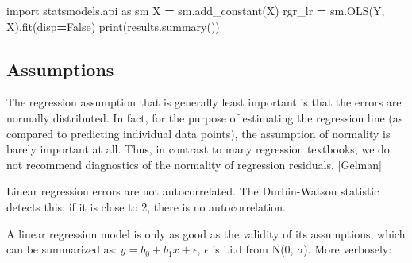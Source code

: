 \documentclass[]{book}
\newenvironment{Shaded}{\begin{snugshade}}{\end{snugshade}}
\newcommand{\ImportTok}[1]{#1}
\newcommand{\VariableTok}[1]{\textcolor[rgb]{0.00,0.00,0.00}{#1}}
\newcommand{\OperatorTok}[1]{\textcolor[rgb]{0.81,0.36,0.00}{\textbf{#1}}}
\newcommand{\BuiltInTok}[1]{#1}
\newcommand{\NormalTok}[1]{#1}
\theoremstyle{definition}
\theoremstyle{definition}
\theoremstyle{definition}
\theoremstyle{remark}
\begin{document}
\begin{Shaded}
\begin{Highlighting}[]
\ImportTok{import}\NormalTok{ statsmodels.api }\ImportTok{as}\NormalTok{ sm}
\NormalTok{X }\OperatorTok{=}\NormalTok{ sm.add_constant(X)}
\NormalTok{rgr_lr }\OperatorTok{=}\NormalTok{ sm.OLS(Y, X).fit(disp}\OperatorTok{=}\VariableTok{False}\NormalTok{)}
\BuiltInTok{print}\NormalTok{(results.summary())}
\end{Highlighting}
\end{Shaded}

\subsection{Assumptions}\label{assumptions}

The regression assumption that is generally least important is that the
errors are normally distributed. In fact, for the purpose of estimating
the regression line (as compared to predicting individual data points),
the assumption of normality is barely important at all. Thus, in
contrast to many regression textbooks, we do not recommend diagnostics
of the normality of regression residuals. {[}Gelman{]}

Linear regression errors are not autocorrelated. The Durbin-Watson
statistic detects this; if it is close to 2, there is no
autocorrelation.

A linear regression model is only as good as the validity of its
assumptions, which can be summarized as: \(y = b_0+b_1x + \epsilon\),
\(\epsilon\) is i.i.d from N(0, \(\sigma\)). More verbosely:
\end{document}
